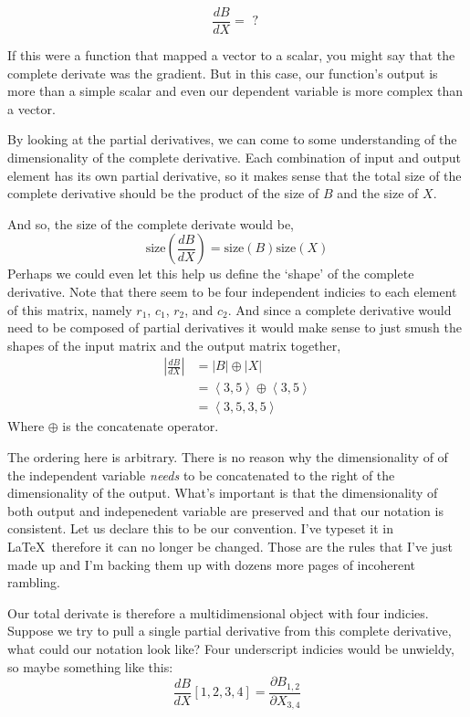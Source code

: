 \documentclass[12pt]{book}
\theoremstyle{plain}
\theoremstyle{definition}
\theoremstyle{ppart}
\theoremstyle{case}
\theoremstyle{solution}
\begin{document}
\[\frac{dB}{dX} = \mbox{ ? }\]

If this were a function that mapped a vector to a scalar, you might say that the
complete derivate was the gradient. But in this case, our function's output is more
than a simple scalar and even our dependent variable is more complex than a vector.

By looking at the partial derivatives, we can come to some understanding of the
dimensionality of the complete derivative. Each combination of input and output
element has its own partial derivative, so it makes sense that the total size
of the complete derivative should be the product of the size of $B$ and the size
of $X$.

And so, the size of the complete derivate would be,
\[
\mbox{size}\left(\frac{dB}{dX}\right) = \mbox{size}(B) \mbox{size}(X)
\]
Perhaps we could even let this help us define the `shape' of the complete
derivative. Note that there seem to be four independent indicies to each element
of this matrix, namely $r_1$, $c_1$, $r_2$, and $c_2$.
And since a complete derivative would need to be composed of partial derivatives
it would make sense to just smush the shapes of the input matrix and the output
matrix together,
\begin{align*}
\left|\frac{dB}{dX}\right| &= |B| \oplus |X| \\
 &= \left< 3, 5 \right> \oplus \left< 3, 5 \right> \\
 &= \left< 3, 5, 3, 5 \right>
\end{align*}
Where $\oplus$ is the concatenate operator.

The ordering here is arbitrary. There is no reason why the dimensionality of
of the independent variable \textit{needs} to be concatenated to the right of the
dimensionality of the output. What's important is that the dimensionality of
both output and indepenedent variable are preserved and that our notation is
consistent. Let us declare this to
be our convention. I've typeset it in \LaTeX ~therefore it can no longer be
changed. Those are the rules that I've just made up and I'm backing them up with
dozens more pages of incoherent rambling.

Our total derivate is therefore a multidimensional object with four indicies.
Suppose we try to pull a single partial derivative from this complete derivative,
what could our notation look like? Four underscript indicies would be unwieldy,
so maybe something like this:
\[
\frac{dB}{dX}[1,2,3,4] = \frac{\partial B_{1,2}}{\partial X_{3,4}}
\]
\end{document}
